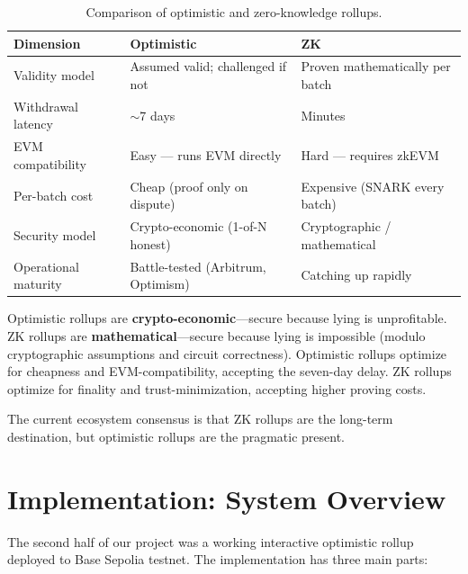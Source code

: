 \documentclass[11pt,letterpaper]{article}
\begin{document}
\begin{table}[h!]
\centering
\renewcommand{\arraystretch}{1.3}
\begin{tabularx}{\textwidth}{lXX}
\toprule
\textbf{Dimension} & \textbf{Optimistic} & \textbf{ZK} \\
\midrule
Validity model      & Assumed valid; challenged if not   & Proven mathematically per batch \\
Withdrawal latency  & $\sim$7 days                        & Minutes \\
EVM compatibility   & Easy --- runs EVM directly         & Hard --- requires zkEVM \\
Per-batch cost      & Cheap (proof only on dispute)       & Expensive (SNARK every batch) \\
Security model      & Crypto-economic (1-of-N honest)    & Cryptographic / mathematical \\
Operational maturity & Battle-tested (Arbitrum, Optimism) & Catching up rapidly \\
\bottomrule
\end{tabularx}
\caption{Comparison of optimistic and zero-knowledge rollups.}
\end{table}

Optimistic rollups are \textbf{crypto-economic}---secure because lying is unprofitable. ZK rollups are \textbf{mathematical}---secure because lying is impossible (modulo cryptographic assumptions and circuit correctness). Optimistic rollups optimize for cheapness and EVM-compatibility, accepting the seven-day delay. ZK rollups optimize for finality and trust-minimization, accepting higher proving costs.

The current ecosystem consensus is that ZK rollups are the long-term destination, but optimistic rollups are the pragmatic present.

\section{Implementation: System Overview}

The second half of our project was a working interactive optimistic rollup deployed to Base Sepolia testnet. The implementation has three main parts:
\end{document}
